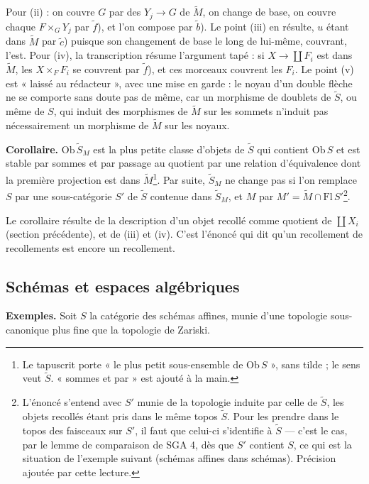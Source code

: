 \documentclass[11pt,a4paper]{article}
\begin{document}
Pour (ii) : on couvre $G$ par des $Y_j \to G$ de $\widetilde{M}$, on change de
base, on couvre chaque $F \times_G Y_j$ par $\tilde{f}$), et l'on compose par
$\tilde{b}$). Le point (iii) en résulte, $u$ étant dans $\widetilde{M}$ par
$\tilde{c}$) puisque son changement de base le long de lui-même, couvrant,
l'est. Pour (iv), la transcription résume l'argument tapé : si $X \to \coprod F_i$
est dans $\widetilde{M}$, les $X \times_F F_i$ se couvrent par $\tilde{f}$), et
ces morceaux couvrent les $F_i$. Le point (v) est « laissé au rédacteur », avec
une mise en garde : le noyau d'un double flèche ne se comporte sans doute pas
de même, car un morphisme de doublets de $\widetilde{S}$, ou même de $S$, qui
induit des morphismes de $\widetilde{M}$ sur les sommets n'induit pas
nécessairement un morphisme de $\widetilde{M}$ sur les noyaux.

\textbf{Corollaire.} $\mathrm{Ob}\,\widetilde{S}_M$ est la plus petite classe
d'objets de $\widetilde{S}$ qui contient $\mathrm{Ob}\,S$ et est stable par
sommes et par passage au quotient par une relation d'équivalence dont la
première projection est dans $\widetilde{M}$\footnote{Le tapuscrit porte « le plus
petit sous-ensemble de $\mathrm{Ob}\,S$ », sans tilde ; le sens veut
$\widetilde{S}$. « sommes et par » est ajouté à la main.}. Par suite,
$\widetilde{S}_M$ ne change pas si l'on remplace $S$ par une sous-catégorie
$S'$ de $\widetilde{S}$ contenue dans $\widetilde{S}_M$, et $M$ par
$M' = \widetilde{M} \cap \mathrm{Fl}\,S'$\footnote{L'énoncé s'entend avec $S'$ munie de la topologie induite par celle
de $\widetilde{S}$, les objets recollés étant pris dans le même topos
$\widetilde{S}$. Pour les prendre dans le topos des faisceaux sur $S'$, il faut
que celui-ci s'identifie à $\widetilde{S}$ — c'est le cas, par le lemme de
comparaison de SGA 4, dès que $S'$ contient $S$, ce qui est la situation de
l'exemple suivant (schémas affines dans schémas). Précision ajoutée par cette
lecture.}.

Le corollaire résulte de la description d'un objet recollé comme quotient de
$\coprod X_i$ (section précédente), et de (iii) et (iv). C'est l'énoncé qui dit
qu'un recollement de recollements est encore un recollement.

\subsection*{Schémas et espaces algébriques}

\textbf{Exemples.} Soit $S$ la catégorie des schémas affines, munie d'une
topologie sous-canonique plus fine que la topologie de Zariski.
\end{document}
